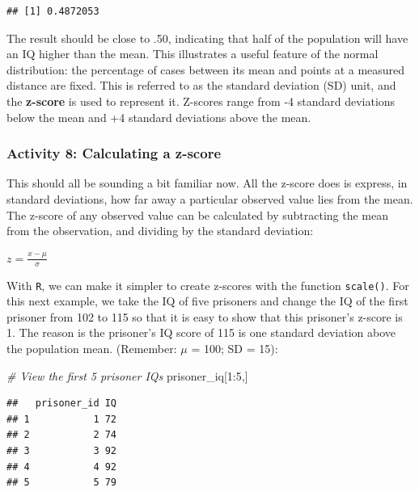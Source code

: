 \documentclass[
]{book}
\newenvironment{Shaded}{\begin{snugshade}}{\end{snugshade}}
\newcommand{\CommentTok}[1]{\textcolor[rgb]{0.56,0.35,0.01}{\textit{#1}}}
\newcommand{\DecValTok}[1]{\textcolor[rgb]{0.00,0.00,0.81}{#1}}
\newcommand{\NormalTok}[1]{#1}
\newcommand{\SpecialCharTok}[1]{\textcolor[rgb]{0.00,0.00,0.00}{#1}}
\begin{document}
\begin{verbatim}
## [1] 0.4872053
\end{verbatim}

The result should be close to .50, indicating that half of the population will have an IQ higher than the mean. This illustrates a useful feature of the normal distribution: the percentage of cases between its mean and points at a measured distance are fixed. This is referred to as the standard deviation (SD) unit, and the \textbf{z-score} is used to represent it. Z-scores range from -4 standard deviations below the mean and +4 standard deviations above the mean.

\hypertarget{activity-8-calculating-a-z-score}{%
\subsubsection{Activity 8: Calculating a z-score}\label{activity-8-calculating-a-z-score}}

This should all be sounding a bit familiar now. All the z-score does is express, in standard deviations, how far away a particular observed value lies from the mean. The z-score of any observed value can be calculated by subtracting the mean from the observation, and dividing by the standard deviation:

\(z = \frac{x - \mu}{\sigma}\)

With \texttt{R}, we can make it simpler to create z-scores with the function \texttt{scale()}. For this next example, we take the IQ of five prisoners and change the IQ of the first prisoner from 102 to 115 so that it is easy to show that this prisoner's z-score is 1. The reason is the prisoner's IQ score of 115 is one standard deviation above the population mean. (Remember: \(\mu\) = 100; SD = 15):

\begin{Shaded}
\begin{Highlighting}[]
\CommentTok{\# View the first 5 prisoner IQs}
\NormalTok{prisoner\_iq[}\DecValTok{1}\SpecialCharTok{:}\DecValTok{5}\NormalTok{,] }
\end{Highlighting}
\end{Shaded}

\begin{verbatim}
##   prisoner_id IQ
## 1           1 72
## 2           2 74
## 3           3 92
## 4           4 92
## 5           5 79
\end{verbatim}
\end{document}
